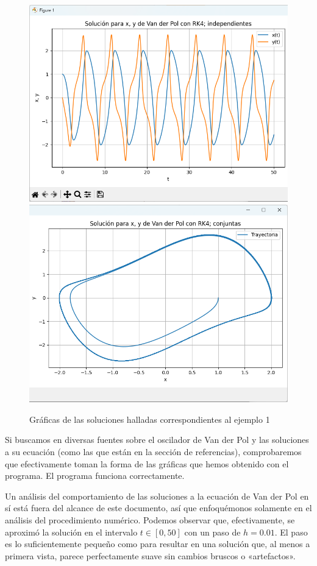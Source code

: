 \begin{figure}[H]\label{fig:ej1}
	\centering
	\includegraphics[scale=0.5]{../auxiliary/assets/ejemplo1-indiv.png}
	\includegraphics[scale=0.5]{../auxiliary/assets/ejemplo1-conj.png}
	\caption{Gráficas de las soluciones halladas correspondientes al ejemplo 1}
\end{figure}
Si buscamos en diversas fuentes sobre el oscilador de Van der Pol y las soluciones a su ecuación (como las que están en la sección de referencias), comprobaremos que efectivamente toman la forma de las gráficas que hemos obtenido con el programa. El programa funciona correctamente.

Un análisis del comportamiento de las soluciones a la ecuación de Van der Pol en sí está fuera del alcance de este documento, así que enfoquémonos solamente en el análisis del procedimiento numérico. Podemos observar que, efectivamente, se aproximó la solución en el intervalo \(t \in [0, 50]\) con un paso de \(h = 0.01\). El paso es lo suficientemente pequeño como para resultar en una solución que, al menos a primera vista, parece perfectamente suave sin cambios bruscos o «artefactos».

